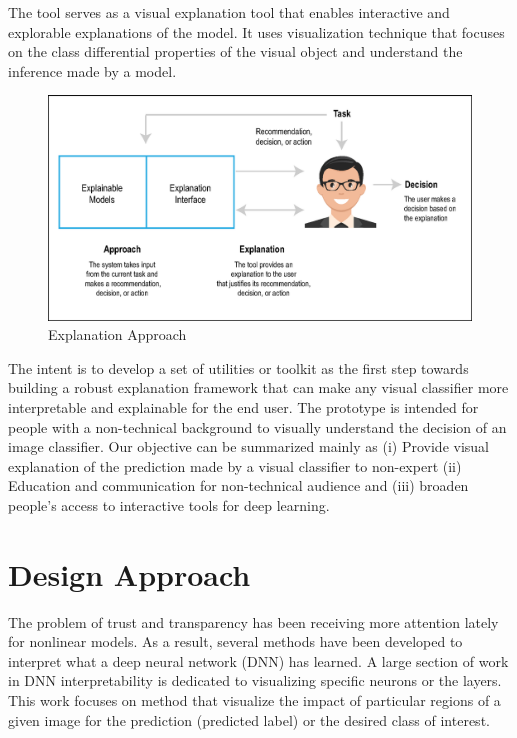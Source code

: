 The tool serves as a visual explanation tool that enables interactive and explorable explanations of the model. It uses visualization technique that focuses on the class differential properties of the visual object and understand the inference made by a model.

\begin{figure}[htbp]
\centering
\includegraphics[width=1\textwidth]{images/xai-1.eps}
\caption{Explanation Approach}
\label{fig:explanation-approach}
\end{figure}

The intent is to develop a set of utilities or toolkit as the first step towards building a robust explanation framework that can make any visual classifier more interpretable and explainable for the end user. The prototype is intended for people with a non-technical background to visually understand the decision of an image classifier. Our objective can be summarized mainly as (i) Provide visual explanation of the prediction made by a visual classifier to non-expert (ii) Education and communication for non-technical audience and (iii) broaden people's access to interactive tools for deep learning.

\section{Design Approach}

The problem of trust and transparency has been receiving more attention lately for nonlinear models. As a result, several methods have been developed to interpret what a deep neural network (DNN) has learned. A large section of work in DNN interpretability is dedicated to visualizing specific neurons or the layers. This work focuses on method that visualize the impact of particular regions of a given image for the prediction (predicted label) or the desired class of interest.

